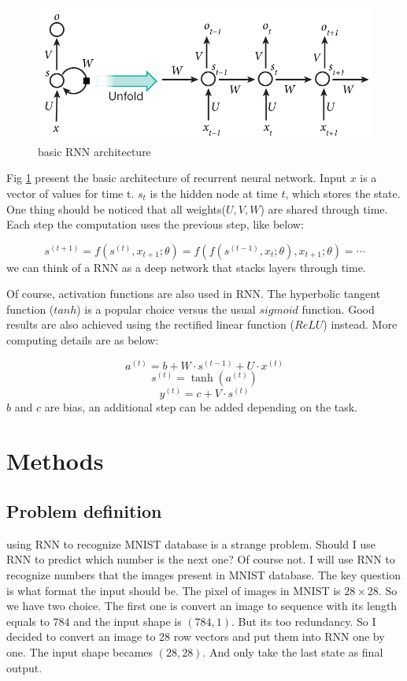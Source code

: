 \documentclass[a4paper,10pt]{article}
\begin{document}
\begin{figure}[htpb]
\centering 
\includegraphics[width=1\textwidth]{report_image/rnn.jpg} 
\caption{basic RNN architecture} 
\label{Fig.RNN} 
\end{figure}

Fig \ref{Fig.RNN} present the basic architecture of recurrent neural network. Input $x$ is a vector of values for time t. $s_t$ is the hidden node at time $t$, which stores the state. One thing should be noticed that all weights($U, V, W$) are shared through time. Each step the computation uses the previous step, like below:

\[
s^{(t+1)}=f\left(s^{(t)}, x_{t+1} ; \theta\right)=f\left(f\left(s^{(t-1)}, x_{t} ; \theta\right), x_{t+1} ; \theta\right)=\cdots
\]
we can think of a RNN as a deep network that stacks layers through time.

Of course, activation functions are also used in RNN. The hyperbolic tangent function ($tanh$) is a popular
choice versus the usual $sigmoid$ function. Good results are also achieved using the rectified linear function ($ReLU$) instead. More computing details are as below:

\begin{equation}
    a^{(t)}=b+W \cdot s^{(t-1)}+U \cdot x^{(t)}
\end{equation}
\begin{equation}
    s^{(t)}=\tanh \left(a^{(t)}\right) 
\end{equation}
\begin{equation}
    y^{(t)}=c+V \cdot s^{(t)}
\end{equation}
$b$ and $c$ are bias, an additional step can be added depending on the task.

\section{Methods}
\subsection{Problem definition}
using RNN to recognize MNIST database is a strange problem. Should I use RNN to predict which number is the next one? Of course not. I will use RNN to recognize numbers that the images present in MNIST database. The key question is what format the input should be. The pixel of images in MNIST is $28\times28$. So we have two choice. The first one is convert an image to sequence with its length equals to $784$ and the input shape is $(784, 1)$. But its too redundancy. So I decided to convert an image to 28 row vectors and put them into RNN one by one. The input shape becames $(28, 28)$. And only take the last state as final output.
\end{document}

